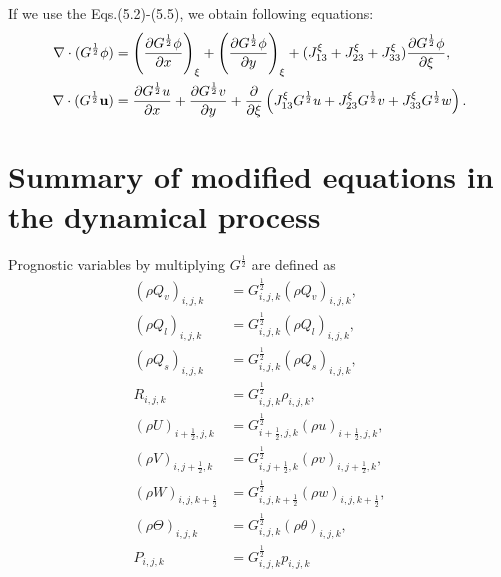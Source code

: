 If we use the Eqs.(5.2)-(5.5), we obtain following equations:
\begin{align}
 \nabla \cdot (G^{\frac{1}{2}} \phi) &= \left(\frac{\partial G^{\frac{1}{2}} \phi}{\partial x}\right)_{\xi}
                                      + \left(\frac{\partial G^{\frac{1}{2}} \phi}{\partial y}\right)_{\xi}
                                      + (J^{\xi}_{13}+J^{\xi}_{23}+J^{\xi}_{33}) \frac{\partial G^{\frac{1}{2}} \phi}{\partial \xi}, \\
 \nabla \cdot (G^{\frac{1}{2}} \bf u) &= \frac{\partial G^{\frac{1}{2}} u}{\partial x}
                                       + \frac{\partial G^{\frac{1}{2}} v}{\partial y}
                                       + \frac{\partial}{\partial \xi}
                                         \left(J^{\xi}_{13} {G^{\frac{1}{2}}} u
                                              +J^{\xi}_{23} {G^{\frac{1}{2}}} v
                                              +J^{\xi}_{33} {G^{\frac{1}{2}}} w
                                         \right).
\end{align}

\section{Summary of modified equations in the dynamical process}

Prognostic variables by multiplying $G^{\frac{1}{2}}$ are defined as
\begin{align}
 (\rho Q_v)_{i,j,k}           &= G^{\frac{1}{2}}_{i,j,k}             (\rho Q_v)_{i,j,k},        \\
 (\rho Q_l)_{i,j,k}           &= G^{\frac{1}{2}}_{i,j,k}             (\rho Q_l)_{i,j,k},        \\
 (\rho Q_s)_{i,j,k}           &= G^{\frac{1}{2}}_{i,j,k}             (\rho Q_s)_{i,j,k},        \\
 R_{i,j,k}                    &= G^{\frac{1}{2}}_{i,j,k}              \rho_{i,j,k},                \\
 (\rho U)_{i+\frac{1}{2},j,k} &= G^{\frac{1}{2}}_{i+\frac{1}{2},j,k} (\rho u)_{i+\frac{1}{2},j,k}, \\
 (\rho V)_{i,j+\frac{1}{2},k} &= G^{\frac{1}{2}}_{i,j+\frac{1}{2},k} (\rho v)_{i,j+\frac{1}{2},k}, \\
 (\rho W)_{i,j,k+\frac{1}{2}} &= G^{\frac{1}{2}}_{i,j,k+\frac{1}{2}} (\rho w)_{i,j,k+\frac{1}{2}}, \\
 (\rho \Theta)_{i,j,k}        &= G^{\frac{1}{2}}_{i,j,k}             (\rho \theta)_{i,j,k},        \\
 P_{i,j,k}                    &= G^{\frac{1}{2}}_{i,j,k}              p_{i,j,k}
\end{align}


